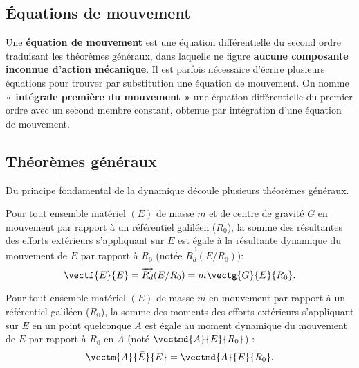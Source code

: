 \subsection{Équations de mouvement}

\begin{defi}

Une \textbf{équation de mouvement} est une équation différentielle du second ordre traduisant les théorèmes généraux, dans laquelle ne figure \textbf{aucune composante inconnue d'action mécanique}. Il est parfois nécessaire d'écrire plusieurs équations pour trouver par substitution une équation de mouvement. On nomme \textbf{« intégrale première du mouvement »} une équation différentielle du premier ordre avec un second membre constant, obtenue par  intégration d'une équation de mouvement. 
\end{defi}

\subsection{Théorèmes généraux}

Du principe fondamental de la dynamique découle plusieurs théorèmes généraux.

\begin{theoreme}
			Pour tout ensemble matériel $(E)$ de masse $m$ et de centre de gravité $G$ en mouvement par rapport à un référentiel galiléen ($R_0$), la somme des résultantes des efforts extérieurs s'appliquant sur $E$ est égale à la résultante dynamique du mouvement de $E$ par rapport à $R_0$ (notée $\overrightarrow{R_d}(E/R_0)$): 
$$\vectf{\bar E}{E}=\overrightarrow{R_d}(E/R_0)=m\vectg{G}{E}{R_0}.$$
\end{theoreme}

\begin{theoreme}

			Pour tout ensemble matériel $(E)$ de masse $m$ en mouvement par rapport à un référentiel galiléen ($R_0$), la somme des moments des efforts extérieurs s'appliquant sur $E$ en un point quelconque $A$ est égale au moment dynamique du mouvement de $E$ par rapport à $R_0$ en $A$ (noté $\vectmd{A}{E}{R_0}$) : 
$$\vectm{A}{\bar E}{E}=\vectmd{A}{E}{R_0}.$$
\end{theoreme}

